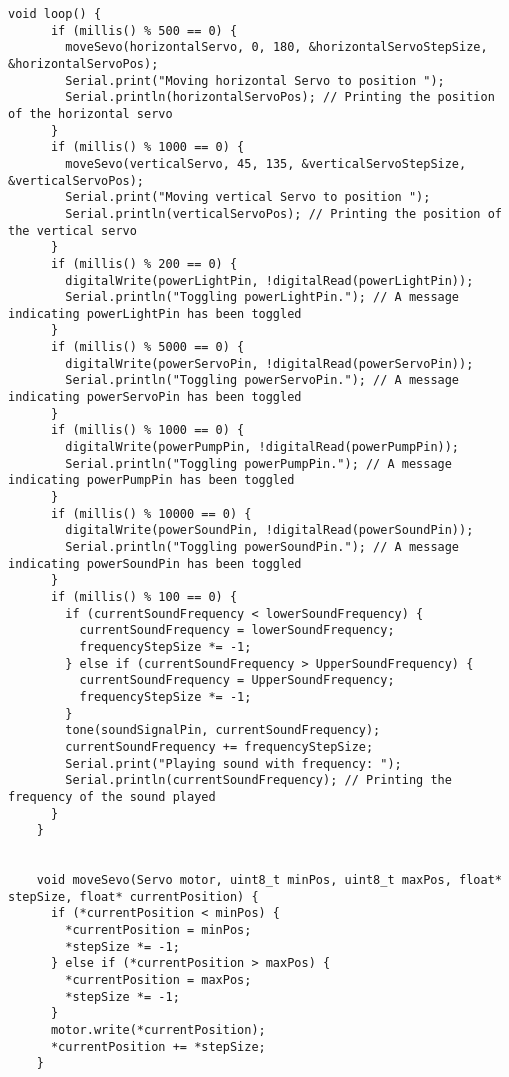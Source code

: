 \begin{lstlisting}[label=list:Arduino_Test,caption=Arduino Test Code um alle Funktionen zu überprüfen.]
    void loop() {
      if (millis() % 500 == 0) {
        moveSevo(horizontalServo, 0, 180, &horizontalServoStepSize, &horizontalServoPos);
        Serial.print("Moving horizontal Servo to position ");
        Serial.println(horizontalServoPos); // Printing the position of the horizontal servo
      }
      if (millis() % 1000 == 0) {
        moveSevo(verticalServo, 45, 135, &verticalServoStepSize, &verticalServoPos);
        Serial.print("Moving vertical Servo to position ");
        Serial.println(verticalServoPos); // Printing the position of the vertical servo
      }
      if (millis() % 200 == 0) {
        digitalWrite(powerLightPin, !digitalRead(powerLightPin));
        Serial.println("Toggling powerLightPin."); // A message indicating powerLightPin has been toggled
      }
      if (millis() % 5000 == 0) {
        digitalWrite(powerServoPin, !digitalRead(powerServoPin));
        Serial.println("Toggling powerServoPin."); // A message indicating powerServoPin has been toggled
      }
      if (millis() % 1000 == 0) {
        digitalWrite(powerPumpPin, !digitalRead(powerPumpPin));
        Serial.println("Toggling powerPumpPin."); // A message indicating powerPumpPin has been toggled
      }
      if (millis() % 10000 == 0) {
        digitalWrite(powerSoundPin, !digitalRead(powerSoundPin));
        Serial.println("Toggling powerSoundPin."); // A message indicating powerSoundPin has been toggled
      }
      if (millis() % 100 == 0) {
        if (currentSoundFrequency < lowerSoundFrequency) {
          currentSoundFrequency = lowerSoundFrequency;
          frequencyStepSize *= -1;
        } else if (currentSoundFrequency > UpperSoundFrequency) {
          currentSoundFrequency = UpperSoundFrequency;
          frequencyStepSize *= -1;
        }
        tone(soundSignalPin, currentSoundFrequency);
        currentSoundFrequency += frequencyStepSize;
        Serial.print("Playing sound with frequency: ");
        Serial.println(currentSoundFrequency); // Printing the frequency of the sound played
      }
    }
    
    
    void moveSevo(Servo motor, uint8_t minPos, uint8_t maxPos, float* stepSize, float* currentPosition) {
      if (*currentPosition < minPos) {
        *currentPosition = minPos;
        *stepSize *= -1;
      } else if (*currentPosition > maxPos) {
        *currentPosition = maxPos;
        *stepSize *= -1;
      }
      motor.write(*currentPosition);
      *currentPosition += *stepSize;
    }
    
    \end{lstlisting}

